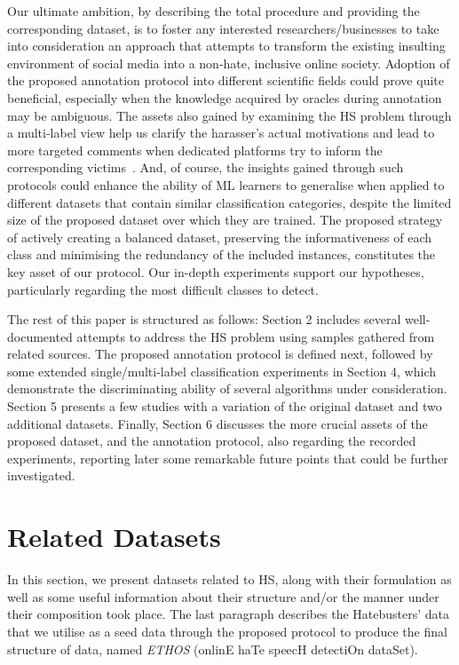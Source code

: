 \documentclass{article}
\begin{document}
Our ultimate ambition, by describing the total procedure and providing the corresponding dataset, is to foster any interested researchers/businesses to take into consideration an approach that attempts to transform the existing insulting environment of social media into a non-hate, inclusive online society. Adoption of the proposed annotation protocol into different scientific fields could prove quite beneficial, especially when the knowledge acquired by oracles during annotation may be ambiguous. The assets also gained by examining the HS problem through a multi-label view help us clarify the harasser's actual motivations and lead to more targeted comments when dedicated platforms try to inform the corresponding victims~\cite{DBLP:conf/ijcai/DinakarPL15}. And, of course, the insights gained through such protocols could enhance the ability of ML learners to generalise when applied to different datasets that contain similar classification categories, despite the limited size of the proposed dataset over which they are trained. The proposed strategy of actively creating a balanced dataset, preserving the informativeness of each class and minimising the redundancy of the included instances, constitutes the key asset of our protocol. Our in-depth experiments support our hypotheses, particularly regarding the most difficult classes to detect.

The rest of this paper is structured as follows: Section 2 includes several well-documented attempts to address the HS problem using samples gathered from related sources. The proposed annotation protocol is defined next, followed by some extended single/multi-label classification experiments in Section 4, which demonstrate the discriminating ability of several algorithms under consideration. Section 5 presents a few studies with a variation of the original dataset and two additional datasets. Finally, Section 6 discusses the more crucial assets of the proposed dataset, and the annotation protocol, also regarding the recorded experiments, reporting later some remarkable future points that could be further investigated.

\section{Related Datasets} 
\label{sec:relDat}
In this section, we present datasets related to HS, along with their formulation as well as some useful information about their structure and/or the manner under their composition took place. The last paragraph describes the Hatebusters' data that we utilise as a seed data through the proposed protocol to produce the final structure of data, named {\em ETHOS} (onlinE haTe speecH detectiOn dataSet).
\end{document}
